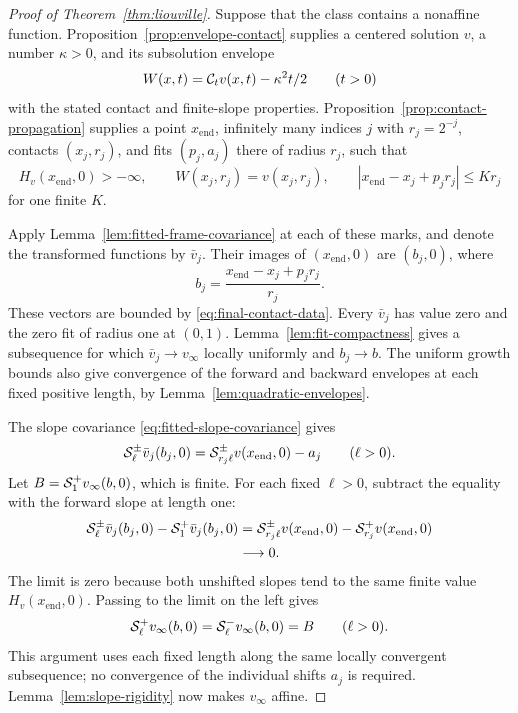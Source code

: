 \begin{proof}[Proof of Theorem~\ref{thm:liouville}]
Suppose that the class contains a nonaffine function. Proposition~\ref{prop:envelope-contact} supplies a centered solution $v$, a number $\kappa>0$, and its subsolution envelope
\[
  W(x,t)=\mathcal{C}_t v(x,t)-\kappa^2t/2\qquad(t>0)
\]
with the stated contact and finite-slope properties. Proposition~\ref{prop:contact-propagation} supplies a point $x_{\mathrm{end}}$, infinitely many indices $j$ with $r_j=2^{-j}$, contacts $(x_j,r_j)$, and fits $(p_j,a_j)$ there of radius $r_j$, such that
\begin{equation}\label{eq:final-contact-data}
  H_v(x_{\mathrm{end}},0)>-\infty,\qquad
  W(x_j,r_j)=v(x_j,r_j),\qquad
  |x_{\mathrm{end}}-x_j+p_jr_j|\le K r_j
\end{equation}
for one finite $K$.

Apply Lemma~\ref{lem:fitted-frame-covariance} at each of these marks, and denote the transformed functions by $\bar v_j$. Their images of $(x_{\mathrm{end}},0)$ are $(b_j,0)$, where
\[
  b_j=\frac{x_{\mathrm{end}}-x_j+p_jr_j}{r_j}.
\]
These vectors are bounded by \eqref{eq:final-contact-data}. Every $\bar v_j$ has value zero and the zero fit of radius one at $(0,1)$. Lemma~\ref{lem:fit-compactness} gives a subsequence for which $\bar v_j\to v_\infty$ locally uniformly and $b_j\to b$. The uniform growth bounds also give convergence of the forward and backward envelopes at each fixed positive length, by Lemma~\ref{lem:quadratic-envelopes}.

The slope covariance \eqref{eq:fitted-slope-covariance} gives
\[
  \mathcal{S}_\ell^\pm\bar v_j(b_j,0)
    =\mathcal{S}_{r_j\ell}^\pm v(x_{\mathrm{end}},0)-a_j
       \qquad(\ell>0).
\]
Let $B=\mathcal{S}_1^+v_\infty(b,0)$, which is finite. For each fixed $\ell>0$, subtract the equality with the forward slope at length one:
\begin{align*}
  \mathcal{S}_\ell^\pm\bar v_j(b_j,0)-\mathcal{S}_1^+\bar v_j(b_j,0)
   &=\mathcal{S}_{r_j\ell}^\pm v(x_{\mathrm{end}},0)
        -\mathcal{S}_{r_j}^+v(x_{\mathrm{end}},0)\\
   &\longrightarrow0.
\end{align*}
The limit is zero because both unshifted slopes tend to the same finite value $H_v(x_{\mathrm{end}},0)$. Passing to the limit on the left gives
\[
  \mathcal{S}_\ell^+v_\infty(b,0)=\mathcal{S}_\ell^-v_\infty(b,0)=B
       \qquad(\ell>0).
\]
This argument uses each fixed length along the same locally convergent subsequence; no convergence of the individual shifts $a_j$ is required. Lemma~\ref{lem:slope-rigidity} now makes $v_\infty$ affine.


\end{proof}
